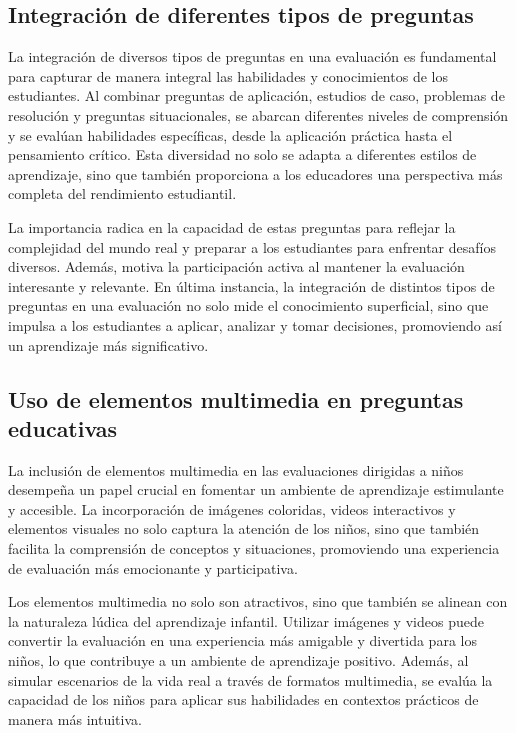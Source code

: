 \subsection{Integración de diferentes tipos de preguntas}

La integración de diversos tipos de preguntas en una evaluación es fundamental para capturar de manera integral las habilidades y conocimientos de los estudiantes. Al combinar preguntas de aplicación, estudios de caso, problemas de resolución y preguntas situacionales, se abarcan diferentes niveles de comprensión y se evalúan habilidades específicas, desde la aplicación práctica hasta el pensamiento crítico. Esta diversidad no solo se adapta a diferentes estilos de aprendizaje, sino que también proporciona a los educadores una perspectiva más completa del rendimiento estudiantil.

La importancia radica en la capacidad de estas preguntas para reflejar la complejidad del mundo real y preparar a los estudiantes para enfrentar desafíos diversos. Además, motiva la participación activa al mantener la evaluación interesante y relevante. En última instancia, la integración de distintos tipos de preguntas en una evaluación no solo mide el conocimiento superficial, sino que impulsa a los estudiantes a aplicar, analizar y tomar decisiones, promoviendo así un aprendizaje más significativo.

\subsection{Uso de elementos multimedia en preguntas educativas}

La inclusión de elementos multimedia en las evaluaciones dirigidas a niños desempeña un papel crucial en fomentar un ambiente de aprendizaje estimulante y accesible. La incorporación de imágenes coloridas, videos interactivos y elementos visuales no solo captura la atención de los niños, sino que también facilita la comprensión de conceptos y situaciones, promoviendo una experiencia de evaluación más emocionante y participativa.

Los elementos multimedia no solo son atractivos, sino que también se alinean con la naturaleza lúdica del aprendizaje infantil. Utilizar imágenes y videos puede convertir la evaluación en una experiencia más amigable y divertida para los niños, lo que contribuye a un ambiente de aprendizaje positivo. Además, al simular escenarios de la vida real a través de formatos multimedia, se evalúa la capacidad de los niños para aplicar sus habilidades en contextos prácticos de manera más intuitiva.

